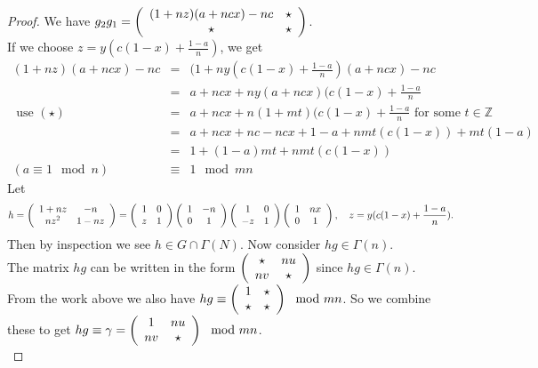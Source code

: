 \begin{proof}
We have $g_2 g_1 = \left(\begin{array}{ c c } (1+nz)(a+ncx) -nc & \star \\  \star &  \star \end{array} \right)$.\\
If we choose $z = y(c(1-x) + \frac{1-a}{n})$, we get 
\begin{eqnarray*}
(1+nz)(a + ncx) -nc &=& (1 + ny(c(1-x) + \frac{1-a}{n})(a + ncx) - nc \\
&=& a+ncx + ny(a+ncx)(c(1-x) + \frac{1-a}{n} \\
\text{ use } (\star) &=& a + ncx + n(1 +mt)(c(1-x) + \frac{1-a}{n} \text{ for some } t \in \mathbb{Z} \\
&=& a + ncx + nc - ncx + 1 -a + nmt(c(1-x)) + mt(1-a) \\
& = & 1 + (1-a)mt + nmt(c(1-x)) \\
(a \equiv 1 \mod n) & \equiv & 1 \mod mn  
\end{eqnarray*}
Let
$$h = \left(\begin{array}{ c c } 1 +nz & -n \\ nz^2 & 1-nz \end{array} \right) = \left(\begin{array}{ c c } 1 & 0 \\ z & 1 \end{array} \right) \left(\begin{array}{ c c } 1 & -n \\ 0 & 1 \end{array} \right)\left(\begin{array}{ c c } 1 & 0 \\ -z & 1 \end{array} \right)\left(\begin{array}{ c c } 1 & nx \\ 0 & 1 \end{array} \right),\quad  z = y(c(1-x) + \frac{1-a}{n}).$$
Then by inspection we see $h \in G \cap \Gamma(N)$. Now consider $hg \in \Gamma(n)$.\\
The matrix $hg$ can be written in the form $\left(\begin{array}{ c c } \star & nu \\ nv & \star \end{array} \right)$ since $hg \in \Gamma(n)$.\\
From the work above we also have $hg \equiv \left(\begin{array}{ c c } 1 & \star \\ \star & \star \end{array} \right) \mod mn$. So we combine these to get $ hg  \equiv \gamma = \left(\begin{array}{ c c } 1 & nu \\ nv & \star \end{array} \right) \mod mn$.\\

\end{proof}
